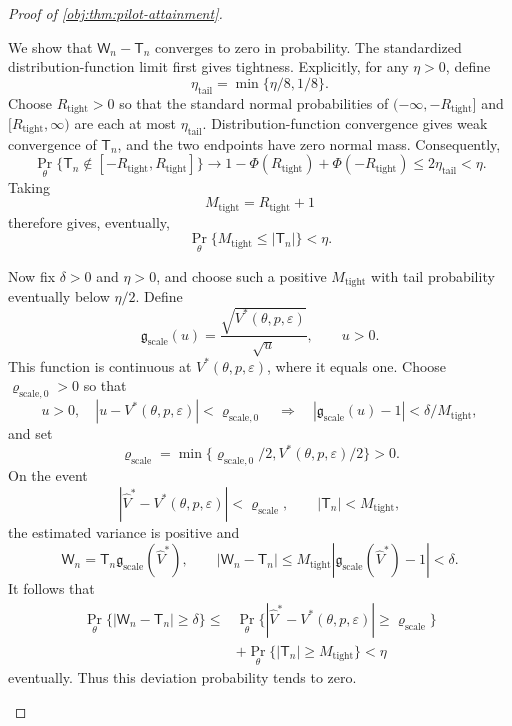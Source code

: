 \begin{proof}[Proof of \cref{obj:thm:pilot-attainment}]
\begin{enumerate}
We show that \(\mathsf W_n-\mathsf T_n\) converges to zero in probability. The standardized distribution-function limit first gives tightness. Explicitly, for any \(\eta>0\), define
\[
\eta_{\mathrm{tail}}=\min\{\eta/8,1/8\}.
\]
Choose \(R_{\mathrm{tight}}>0\) so that the standard normal probabilities of
\((-\infty,-R_{\mathrm{tight}}]\) and
\([R_{\mathrm{tight}},\infty)\) are each at most
\(\eta_{\mathrm{tail}}\). Distribution-function convergence gives weak convergence of \(\mathsf T_n\), and the two endpoints have zero normal mass. Consequently,
\[
\Pr_\theta\{\mathsf T_n\notin[-R_{\mathrm{tight}},R_{\mathrm{tight}}]\}
\longrightarrow
1-\Phi(R_{\mathrm{tight}})+\Phi(-R_{\mathrm{tight}})
\le2\eta_{\mathrm{tail}}<\eta.
\]
Taking
\[
M_{\mathrm{tight}}=R_{\mathrm{tight}}+1
\]
therefore gives, eventually,
\[
\Pr_\theta\{M_{\mathrm{tight}}\le|\mathsf T_n|\}<\eta.
\]

Now fix \(\delta>0\) and \(\eta>0\), and choose such a positive
\(M_{\mathrm{tight}}\) with tail probability eventually below \(\eta/2\).
Define
\[
\mathfrak g_{\mathrm{scale}}(u)
=\frac{\sqrt{V^*(\theta,p,\varepsilon)}}{\sqrt u},
\qquad u>0.
\]
This function is continuous at \(V^*(\theta,p,\varepsilon)\), where it equals one. Choose \(\varrho_{\mathrm{scale},0}>0\) so that
\[
u>0,\quad |u-V^*(\theta,p,\varepsilon)|<\varrho_{\mathrm{scale},0}
\quad\Longrightarrow\quad
|\mathfrak g_{\mathrm{scale}}(u)-1|
<\delta/M_{\mathrm{tight}},
\]
and set
\[
\varrho_{\mathrm{scale}}
=
\min\{\varrho_{\mathrm{scale},0}/2,
V^*(\theta,p,\varepsilon)/2\}>0.
\]
On the event
\[
|\widehat V^*-V^*(\theta,p,\varepsilon)|
<\varrho_{\mathrm{scale}},
\qquad
|\mathsf T_n|<M_{\mathrm{tight}},
\]
the estimated variance is positive and
\[
\mathsf W_n
=\mathsf T_n\mathfrak g_{\mathrm{scale}}(\widehat V^*),
\qquad
|\mathsf W_n-\mathsf T_n|
\le M_{\mathrm{tight}}
|\mathfrak g_{\mathrm{scale}}(\widehat V^*)-1|
<\delta.
\]
It follows that
\[
\begin{aligned}
\Pr_\theta\{|\mathsf W_n-\mathsf T_n|\ge\delta\}
\le{}&
\Pr_\theta\{|\widehat V^*-V^*(\theta,p,\varepsilon)|
\ge\varrho_{\mathrm{scale}}\}\\
&+\Pr_\theta\{|\mathsf T_n|\ge M_{\mathrm{tight}}\}
<\eta
\end{aligned}
\]
eventually. Thus this deviation probability tends to zero.


\end{enumerate}
\end{proof}
